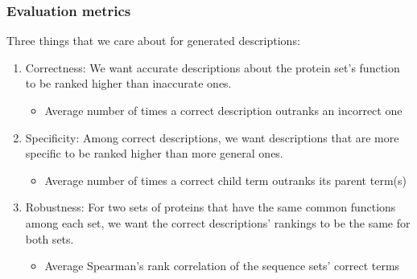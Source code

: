 \documentclass{beamer}
\begin{document}
\begin{frame}
\frametitle{Evaluation metrics}
Three things that we care about for generated descriptions:\pause
\begin{enumerate}
    \item Correctness: We want accurate descriptions about the protein set's function to be ranked higher than inaccurate ones.\pause
        \begin{itemize}
            \item Average number of times a correct description outranks an incorrect one\pause
        \end{itemize}
    \item Specificity: Among correct descriptions, we want descriptions that are more specific to be ranked higher than more general ones.\pause
        \begin{itemize}
            \item Average number of times a correct child term outranks its parent term(s)\pause
        \end{itemize}
    \item Robustness: For two sets of proteins that have the same common functions among each set, we want the correct descriptions' rankings to be the same for both sets.\pause
        \begin{itemize}
            \item Average Spearman's rank correlation of the sequence sets' correct terms\pause
        \end{itemize}

\end{enumerate}
\end{frame}
\end{document}
